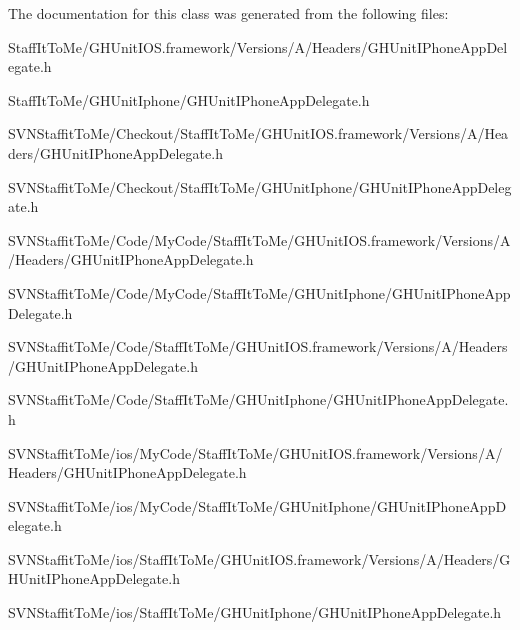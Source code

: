 \-The documentation for this class was generated from the following files\-:\begin{DoxyCompactItemize}
\item 
\-Staff\-It\-To\-Me/\-G\-H\-Unit\-I\-O\-S.\-framework/\-Versions/\-A/\-Headers/\-G\-H\-Unit\-I\-Phone\-App\-Delegate.\-h\item 
\-Staff\-It\-To\-Me/\-G\-H\-Unit\-Iphone/\-G\-H\-Unit\-I\-Phone\-App\-Delegate.\-h\item 
\-S\-V\-N\-Staffit\-To\-Me/\-Checkout/\-Staff\-It\-To\-Me/\-G\-H\-Unit\-I\-O\-S.\-framework/\-Versions/\-A/\-Headers/\-G\-H\-Unit\-I\-Phone\-App\-Delegate.\-h\item 
\-S\-V\-N\-Staffit\-To\-Me/\-Checkout/\-Staff\-It\-To\-Me/\-G\-H\-Unit\-Iphone/\-G\-H\-Unit\-I\-Phone\-App\-Delegate.\-h\item 
\-S\-V\-N\-Staffit\-To\-Me/\-Code/\-My\-Code/\-Staff\-It\-To\-Me/\-G\-H\-Unit\-I\-O\-S.\-framework/\-Versions/\-A/\-Headers/\-G\-H\-Unit\-I\-Phone\-App\-Delegate.\-h\item 
\-S\-V\-N\-Staffit\-To\-Me/\-Code/\-My\-Code/\-Staff\-It\-To\-Me/\-G\-H\-Unit\-Iphone/\-G\-H\-Unit\-I\-Phone\-App\-Delegate.\-h\item 
\-S\-V\-N\-Staffit\-To\-Me/\-Code/\-Staff\-It\-To\-Me/\-G\-H\-Unit\-I\-O\-S.\-framework/\-Versions/\-A/\-Headers/\-G\-H\-Unit\-I\-Phone\-App\-Delegate.\-h\item 
\-S\-V\-N\-Staffit\-To\-Me/\-Code/\-Staff\-It\-To\-Me/\-G\-H\-Unit\-Iphone/\-G\-H\-Unit\-I\-Phone\-App\-Delegate.\-h\item 
\-S\-V\-N\-Staffit\-To\-Me/ios/\-My\-Code/\-Staff\-It\-To\-Me/\-G\-H\-Unit\-I\-O\-S.\-framework/\-Versions/\-A/\-Headers/\-G\-H\-Unit\-I\-Phone\-App\-Delegate.\-h\item 
\-S\-V\-N\-Staffit\-To\-Me/ios/\-My\-Code/\-Staff\-It\-To\-Me/\-G\-H\-Unit\-Iphone/\-G\-H\-Unit\-I\-Phone\-App\-Delegate.\-h\item 
\-S\-V\-N\-Staffit\-To\-Me/ios/\-Staff\-It\-To\-Me/\-G\-H\-Unit\-I\-O\-S.\-framework/\-Versions/\-A/\-Headers/\-G\-H\-Unit\-I\-Phone\-App\-Delegate.\-h\item 
\-S\-V\-N\-Staffit\-To\-Me/ios/\-Staff\-It\-To\-Me/\-G\-H\-Unit\-Iphone/\-G\-H\-Unit\-I\-Phone\-App\-Delegate.\-h\end{DoxyCompactItemize}
